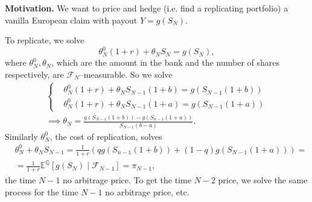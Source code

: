 \documentclass{article}
\theoremstyle{definition}
\begin{document}
\textbf{Motivation.} We want to price and hedge (i.e. find a replicating portfolio) a vanilla European claim with payout $Y=g(S_N)$.

To replicate, we solve \[
    \theta_N^0(1+r) + \theta_N S_N = g(S_N),
\]
where $\theta_N^0, \theta_N$, which are the amount in the bank and the number of shares respectively, are $\mathcal{F}_N$--measurable. So we solve 
\begin{align*}
    \begin{cases}
        &\theta_N^0(1+r) + \theta_N S_{N-1}(1+b) = g(S_{N-1}(1+b))\\
        &\theta_N^0(1+r) + \theta_N S_{N-1}(1+a) = g(S_{N-1}(1+a))
    \end{cases}\\
    \implies \theta_N = \frac{g(S_{N-1}(1+b))-g(S_{n-1}(1+a))}{S_{N-1}(b-a)}.
\end{align*}
Similarly $\theta_N^0$, the cost of replication, solves 
\begin{align*}
    &\theta_N^0 + \theta_N S_{N-1} = \frac{1}{1+r} \left(q g(S_{n-1}(1+b)) + (1-q)g(S_{N-1}(1+a))\right) =\\
    &= \frac{1}{1+r} \mathbb{E}^\mathbb{Q}[g(S_N) \mid \mathcal{F}_{N-1}] = \pi_{N-1},     
\end{align*}
the time $N-1$ no arbitrage price.
To get the time $N-2$ price, we solve the same process for the time $N-1$ no arbitrage price, etc.
\end{document}
